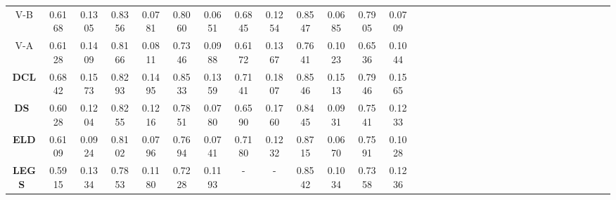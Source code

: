 \documentclass[10pt,twocolumn,letterpaper]{article}
\begin{document}
\begin{table*}
\begin{center}
\begin{tabular}{|c|c|c|c|c|c|c|c|c|c|c|c|c|c|c||c|c|c|c|c|c|c|c|c|c|c|c|c|c|c|c|c|c|c|c|c|c|c|c|c|||c|c|c|c|c|c|c|c|||}
\multicolumn{4}{|c|}{V-B}
&\multicolumn{2}{|c|}{0.6168}&\multicolumn{2}{|c|}{0.1305}&\multicolumn{2}{|c|}{\textcolor[rgb]{0,0,1}{0.8356}}&\multicolumn{2}{|c|}{\textcolor[rgb]{0,0,1}{0.0781}}&\multicolumn{2}{|c|}{0.8060}&\multicolumn{2}{|c|}{\textcolor[rgb]{0,1,0}{0.0651}}&\multicolumn{2}{|c|}{0.6845}&\multicolumn{2}{|c|}{0.1254}&\multicolumn{2}{|c|}{0.8547}&\multicolumn{2}{|c|}{\textcolor[rgb]{0,0,1}{0.0685}}&\multicolumn{2}{|c|}{0.7905}&\multicolumn{2}{|c|}{\textcolor[rgb]{0,1,0}{0.0709}}\\
\multicolumn{4}{|c|}{V-A}
&\multicolumn{2}{|c|}{0.6128}&\multicolumn{2}{|c|}{0.1409}&\multicolumn{2}{|c|}{0.8166}&\multicolumn{2}{|c|}{0.0811}&\multicolumn{2}{|c|}{0.7346}&\multicolumn{2}{|c|}{0.0988}&\multicolumn{2}{|c|}{0.6172}&\multicolumn{2}{|c|}{0.1367}&\multicolumn{2}{|c|}{0.7641}&\multicolumn{2}{|c|}{0.1023}&\multicolumn{2}{|c|}{0.6536}&\multicolumn{2}{|c|}{0.1044}\\
\hline
\multicolumn{4}{|c|}{\textbf{DCL}~\cite{Li_2016_CVPR}}
&\multicolumn{2}{|c|}{\textcolor[rgb]{1,0,0}{0.6842}}&\multicolumn{2}{|c|}{0.1573}&\multicolumn{2}{|c|}{0.8293}&\multicolumn{2}{|c|}{0.1495}&\multicolumn{2}{|c|}{\textcolor[rgb]{1,0,0}{0.8533}}&\multicolumn{2}{|c|}{0.1359}&\multicolumn{2}{|c|}{0.7141}&\multicolumn{2}{|c|}{0.1807}&\multicolumn{2}{|c|}{0.8546}&\multicolumn{2}{|c|}{0.1513}&\multicolumn{2}{|c|}{0.7946}&\multicolumn{2}{|c|}{0.1565}\\
\multicolumn{4}{|c|}{\textbf{DS}~\cite{Li2016DeepSaliency}}
&\multicolumn{2}{|c|}{0.6028}&\multicolumn{2}{|c|}{0.1204}&\multicolumn{2}{|c|}{0.8255}&\multicolumn{2}{|c|}{0.1216}&\multicolumn{2}{|c|}{0.7851}&\multicolumn{2}{|c|}{0.0780}&\multicolumn{2}{|c|}{0.6590}&\multicolumn{2}{|c|}{0.1760}&\multicolumn{2}{|c|}{0.8445}&\multicolumn{2}{|c|}{0.0931}&\multicolumn{2}{|c|}{0.7541}&\multicolumn{2}{|c|}{0.1233}\\
\multicolumn{4}{|c|}{\textbf{ELD}~\cite{Lee_2016_CVPR}}
&\multicolumn{2}{|c|}{0.6109}&\multicolumn{2}{|c|}{\textcolor[rgb]{0,1,0}{0.0924}}&\multicolumn{2}{|c|}{0.8102}&\multicolumn{2}{|c|}{0.0796}&\multicolumn{2}{|c|}{0.7694}&\multicolumn{2}{|c|}{0.0741}&\multicolumn{2}{|c|}{0.7180}&\multicolumn{2}{|c|}{\textcolor[rgb]{0,0,1}{0.1232}}&\multicolumn{2}{|c|}{\textcolor[rgb]{1,0,0}{0.8715}}&\multicolumn{2}{|c|}{0.0670}&\multicolumn{2}{|c|}{0.7591}&\multicolumn{2}{|c|}{0.1028}\\
\multicolumn{4}{|c|}{\textbf{LEGS}~\cite{wang2015deep}}
&\multicolumn{2}{|c|}{0.5915}&\multicolumn{2}{|c|}{0.1334}&\multicolumn{2}{|c|}{0.7853}&\multicolumn{2}{|c|}{0.1180}&\multicolumn{2}{|c|}{0.7228}&\multicolumn{2}{|c|}{0.1193}&\multicolumn{2}{|c|}{-}&\multicolumn{2}{|c|}{-}&\multicolumn{2}{|c|}{0.8542}&\multicolumn{2}{|c|}{0.1034}&\multicolumn{2}{|c|}{0.7358}&\multicolumn{2}{|c|}{0.1236}\\

\end{tabular}
\end{center}
\end{table*}
\end{document}

